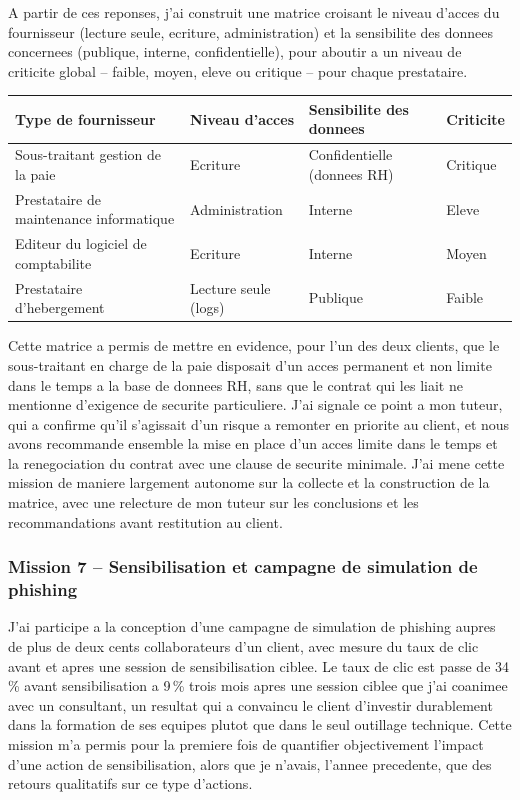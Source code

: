 \documentclass[11pt,a4paper]{article}
\begin{document}
A partir de ces reponses, j'ai construit une matrice croisant le niveau d'acces du fournisseur (lecture seule, ecriture, administration) et la sensibilite des donnees concernees (publique, interne, confidentielle), pour aboutir a un niveau de criticite global -- faible, moyen, eleve ou critique -- pour chaque prestataire.

\begin{center}
\small
\begin{tabular}{@{}p{4.6cm}p{3.2cm}p{3.4cm}p{2.2cm}@{}}
\toprule
\textbf{Type de fournisseur} & \textbf{Niveau d'acces} & \textbf{Sensibilite des donnees} & \textbf{Criticite} \\
\midrule
Sous-traitant gestion de la paie & Ecriture & Confidentielle (donnees RH) & Critique \\
Prestataire de maintenance informatique & Administration & Interne & Eleve \\
Editeur du logiciel de comptabilite & Ecriture & Interne & Moyen \\
Prestataire d'hebergement & Lecture seule (logs) & Publique & Faible \\
\bottomrule
\end{tabular}
\end{center}

Cette matrice a permis de mettre en evidence, pour l'un des deux clients, que le sous-traitant en charge de la paie disposait d'un acces permanent et non limite dans le temps a la base de donnees RH, sans que le contrat qui les liait ne mentionne d'exigence de securite particuliere. J'ai signale ce point a mon tuteur, qui a confirme qu'il s'agissait d'un risque a remonter en priorite au client, et nous avons recommande ensemble la mise en place d'un acces limite dans le temps et la renegociation du contrat avec une clause de securite minimale. J'ai mene cette mission de maniere largement autonome sur la collecte et la construction de la matrice, avec une relecture de mon tuteur sur les conclusions et les recommandations avant restitution au client.

\subsubsection*{Mission 7 -- Sensibilisation et campagne de simulation de phishing}

J'ai participe a la conception d'une campagne de simulation de phishing aupres de plus de deux cents collaborateurs d'un client, avec mesure du taux de clic avant et apres une session de sensibilisation ciblee. Le taux de clic est passe de 34\,\% avant sensibilisation a 9\,\% trois mois apres une session ciblee que j'ai coanimee avec un consultant, un resultat qui a convaincu le client d'investir durablement dans la formation de ses equipes plutot que dans le seul outillage technique. Cette mission m'a permis pour la premiere fois de quantifier objectivement l'impact d'une action de sensibilisation, alors que je n'avais, l'annee precedente, que des retours qualitatifs sur ce type d'actions.
\end{document}
